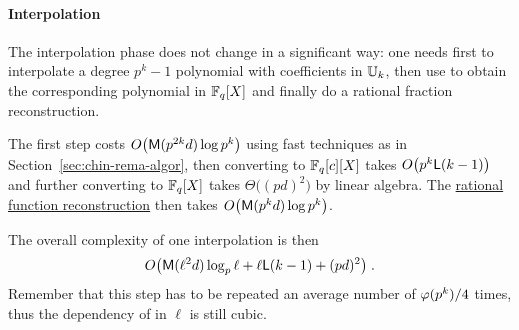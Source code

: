 \paragraph{Interpolation}
The interpolation phase does not change in a significant way: one
needs first to interpolate a degree $p^k-1$ polynomial with
coefficients in $\mathbb{U}_k$, then use
 to obtain the corresponding
polynomial in $\mathbb{F}_q[X]$ and finally do a rational fraction
reconstruction.

The first step costs $O\bigl(\mathsf{M}(p^{2k}d)\log p^k\bigr)$ using fast
techniques as in Section~\ref{sec:chin-rema-algor}, then converting to
$\mathbb{F}_q[c][X]$ takes $O\bigl(p^k\mathsf{L}(k-1)\bigr)$ and further
converting to $\mathbb{F}_q[X]$ takes $\Theta\bigl((pd)^2\bigr)$ by linear
algebra. The \hyperref[sec:eucl-algor-rati]{rational function
  reconstruction} then takes $O\bigl(\mathsf{M}(p^kd)\log p^k\bigr)$.

The overall complexity of one interpolation is then
\begin{equation}
  \label{eq:C2-AS:complexity:interp}
  O\bigl(\mathsf{M}(\ell^2d)\log_p\ell + \ell\mathsf{L}(k-1) + (pd)^2\bigr)
  \;\text{.}
\end{equation}
Remember that this step has to be repeated an average number of
$\varphi(p^k)/4$ times, thus the dependency of \ctwoas{} in $\ell$ is still cubic.



%
